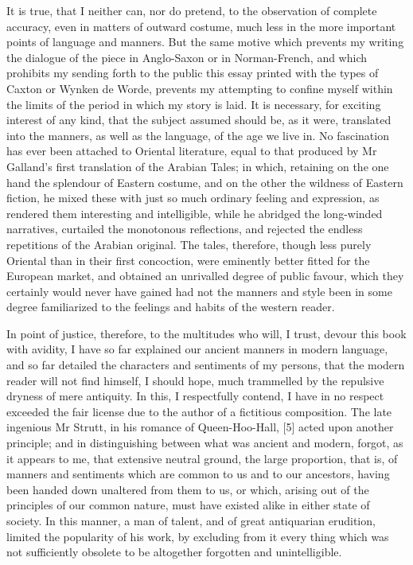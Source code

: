 It is true, that I neither can, nor do pretend, to the observation of
complete accuracy, even in matters of outward costume, much less in the
more important points of language and manners. But the same motive which
prevents my writing the dialogue of the piece in Anglo-Saxon or in
Norman-French, and which prohibits my sending forth to the public this
essay printed with the types of Caxton or Wynken de Worde, prevents my
attempting to confine myself within the limits of the period in which my
story is laid. It is necessary, for exciting interest of any kind, that
the subject assumed should be, as it were, translated into the manners,
as well as the language, of the age we live in. No fascination has ever
been attached to Oriental literature, equal to that produced by Mr
Galland's first translation of the Arabian Tales; in which, retaining on
the one hand the splendour of Eastern costume, and on the other the
wildness of Eastern fiction, he mixed these with just so much ordinary
feeling and expression, as rendered them interesting and intelligible,
while he abridged the long-winded narratives, curtailed the monotonous
reflections, and rejected the endless repetitions of the Arabian
original. The tales, therefore, though less purely Oriental than in
their first concoction, were eminently better fitted for the European
market, and obtained an unrivalled degree of public favour, which they
certainly would never have gained had not the manners and style been in
some degree familiarized to the feelings and habits of the western
reader.

In point of justice, therefore, to the multitudes who will, I trust,
devour this book with avidity, I have so far explained our ancient
manners in modern language, and so far detailed the characters and
sentiments of my persons, that the modern reader will not find himself,
I should hope, much trammelled by the repulsive dryness of mere
antiquity. In this, I respectfully contend, I have in no respect
exceeded the fair license due to the author of a fictitious composition.
The late ingenious Mr Strutt, in his romance of Queen-Hoo-Hall, {[}5{]}
acted upon another principle; and in distinguishing between what was
ancient and modern, forgot, as it appears to me, that extensive neutral
ground, the large proportion, that is, of manners and sentiments which
are common to us and to our ancestors, having been handed down unaltered
from them to us, or which, arising out of the principles of our common
nature, must have existed alike in either state of society. In this
manner, a man of talent, and of great antiquarian erudition, limited the
popularity of his work, by excluding from it every thing which was not
sufficiently obsolete to be altogether forgotten and unintelligible.

